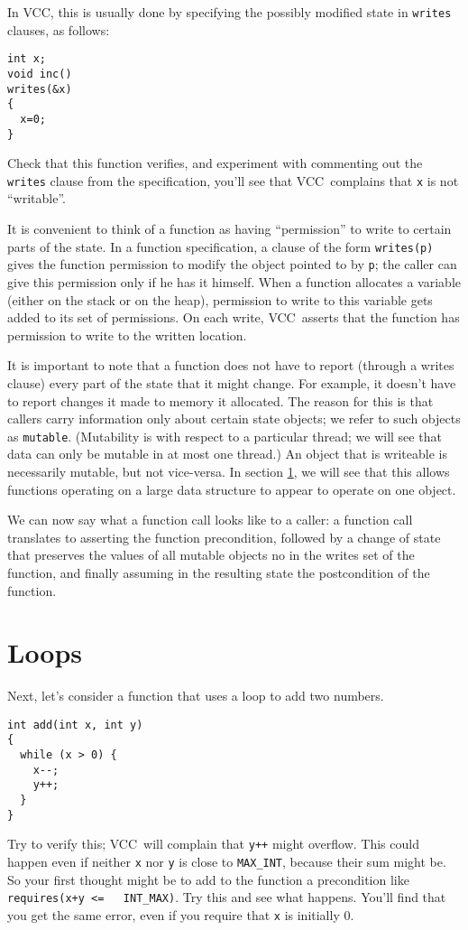 \documentclass{report}
\newcommand{\Q}[1]{\lstinline~#1~}
\newcommand{\VCC}{VCC}
\newcommand{\Ref}[1]{section \ref{#1}}
\begin{document}
In \VCC, this is usually done by specifying the possibly modified
state in \Q{writes} clauses, as follows:
\begin{lstlisting}
int x;
void inc() 
writes(&x)
{
  x=0;
}
\end{lstlisting}
Check that this function verifies, and experiment with commenting out
the \Q{writes} clause from the specification, you'll see that
\VCC\ complains that \Q{x} is not ``writable''. 

It is convenient to think of a function as having ``permission'' to
write to certain parts of the state. In a function specification, a
clause of the form \Q{writes(p)} gives the function permission to
modify the object pointed to by \Q{p}; the caller can give this
permission only if he has it himself.  When a function allocates a
variable (either on the stack or on the heap), permission to write to
this variable gets added to its set of permissions. On each write,
\VCC\ asserts that the function has permission to write to the written
location.

It is important to note that a function does not have to report
(through a writes clause) every part of the state that it might
change. For example, it doesn't have to report changes it made to
memory it allocated. The reason for this is that callers carry
information only about certain state objects; we refer to such objects
as \Q{mutable}. (Mutability is with respect to a particular thread; we
will see that data can only be mutable in at most one thread.) An
object that is writeable is necessarily mutable, but not vice-versa.
In \Ref{}, we will see that this allows functions operating
on a large data structure to appear to operate on one object.

We can now say what a function call looks like to a caller: a function
call translates to asserting the function precondition, followed by a
change of state that preserves the values of all mutable objects no in
the writes set of the function, and finally assuming in the resulting
state the postcondition of the function.

\section{Loops}
Next, let's consider a function that uses a loop to add two numbers.
\begin{lstlisting}
int add(int x, int y)
{
  while (x > 0) {
    x--;
    y++;
  }
}
\end{lstlisting}
Try to verify this; \VCC\ will complain that \Q{y++} might
overflow. This could happen even if neither \Q{x} nor \Q{y} is close
to \Q{MAX_INT}, because their sum might be. So your first thought
might be to add to the function a precondition like \Q{requires(x+y <=
  INT_MAX)}. Try this and see what happens. You'll find that you get
the same error, even if you require that \Q{x} is initially 0.
\end{document}
